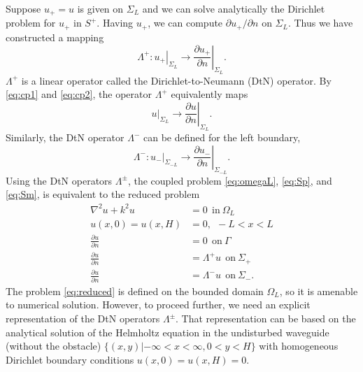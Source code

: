 \documentclass[11pt]{article}
\begin{document}
Suppose $u_+ = u$ is given on $\Sigma_L$ and we can solve analytically the Dirichlet problem for $u_+$ in $S^+$. Having $u_+$, we can compute $\partial u_+/\partial n$ on $\Sigma_L$. Thus we have constructed a mapping
\begin{equation}
  \label{eq:12}
  \Lambda^+: \left.u_+\right|_{\Sigma_L} \rightarrow \left.\frac{\partial u_+}{\partial n}\right|_{\Sigma_L}.
\end{equation}
$\Lambda^+$ is a linear operator called the Dirichlet-to-Neumann (DtN) operator. By \eqref{eq:cp1} and \eqref{eq:cp2}, the operator $\Lambda^+$ equivalently maps
\begin{equation}
  \label{eq:13}
  \left.u\right|_{\Sigma_L} \rightarrow \left.\frac{\partial u}{\partial n}\right|_{\Sigma_L}.
\end{equation}
Similarly, the DtN operator $\Lambda^-$ can be defined for the left boundary,
\begin{equation}
  \label{eq:14}
  \Lambda^-: \left.u_-\right|_{\Sigma_{-L}} \rightarrow \left.\frac{\partial u_-}{\partial n}\right|_{\Sigma_{-L}}.  
\end{equation}
Using the DtN operators $\Lambda^{\pm}$, the coupled problem \eqref{eq:omegaL}, \eqref{eq:Sp}, and \eqref{eq:Sm}, is equivalent to the reduced problem
\begin{subequations}
  \label{eq:reduced}
  \begin{align}
    \nabla^2 u + k^2u &= 0~~\mathrm{in}~\Omega_L \\
  u(x,0)=u(x,H)&=0,~~-L < x < L \\
  \frac{\partial u}{\partial n} &= 0~~\mathrm{on}~ \Gamma \\
  \frac{\partial u}{\partial n} &= \Lambda^+ u~~\mathrm{on}~\Sigma_{+} \\
  \frac{\partial u}{\partial n} &= \Lambda^- u~~\mathrm{on}~\Sigma_{-}. 
  \end{align}
\end{subequations}
The problem \eqref{eq:reduced} is defined on the bounded domain $\Omega_L$, so it is amenable to numerical solution. However, to proceed further, we need an explicit representation of the DtN operators $\Lambda^{\pm}$. That representation can be based on the analytical solution of the Helmholtz equation in the undisturbed waveguide (without the obstacle) $\{(x,y)| -\infty < x < \infty, 0 < y < H\}$ with homogeneous Dirichlet boundary conditions $u(x,0)=u(x,H) = 0$.
\end{document}
